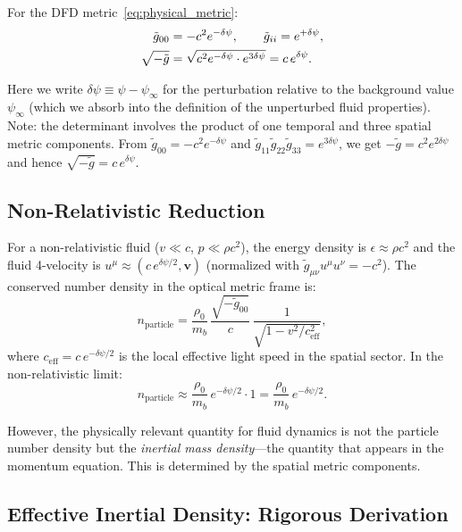 \documentclass[12pt,twocolumn]{article}
\newcommand{\Reff}{\mathrm{eff}}
\newcommand{\vvec}{\mathbf{v}}
\newcommand{\dpsi}{\delta\psi}
\begin{document}
For the DFD metric~\eqref{eq:physical_metric}:
\begin{align}
\tilde{g}_{00} &= -c^2 e^{-\dpsi}, \qquad
\tilde{g}_{ii} = e^{+\dpsi}, \notag\\
\sqrt{-\tilde{g}} &= \sqrt{c^2 e^{-\dpsi} \cdot e^{3\dpsi}}
= c\,e^{\dpsi}.
\label{eq:metric_det}
\end{align}

Here we write $\dpsi \equiv \psi - \psi_\infty$ for the perturbation relative
to the background value $\psi_\infty$ (which we absorb into the definition
of the unperturbed fluid properties). Note: the determinant involves the
product of one temporal and three spatial metric components. From
$\tilde{g}_{00} = -c^2 e^{-\dpsi}$ and $\tilde{g}_{11}\tilde{g}_{22}
\tilde{g}_{33} = e^{3\dpsi}$, we get $-\tilde{g} = c^2 e^{2\dpsi}$ and hence
$\sqrt{-\tilde{g}} = c\,e^{\dpsi}$.

\subsection{Non-Relativistic Reduction}
\label{sec:nr_reduction}

For a non-relativistic fluid ($v \ll c$, $p \ll \rho c^2$), the energy density
is $\epsilon \approx \rho c^2$ and the fluid 4-velocity is
$u^\mu \approx (c\,e^{\dpsi/2}, \vvec)$ (normalized with $\tilde{g}_{\mu\nu}
u^\mu u^\nu = -c^2$). The conserved number density in the optical metric frame
is:
\begin{equation}
n_\mathrm{particle} = \frac{\rho_0}{m_b}\,
\frac{\sqrt{-\tilde{g}_{00}}}{c}\,\frac{1}{\sqrt{1-v^2/c_\Reff^2}},
\end{equation}
where $c_\Reff = c\,e^{-\dpsi/2}$ is the local effective light speed in the
spatial sector. In the non-relativistic limit:
\begin{equation}
n_\mathrm{particle} \approx \frac{\rho_0}{m_b}\,e^{-\dpsi/2}\cdot 1
= \frac{\rho_0}{m_b}\,e^{-\dpsi/2}.
\end{equation}

However, the physically relevant quantity for fluid dynamics is not the
particle number density but the \emph{inertial mass density}---the quantity
that appears in the momentum equation. This is determined by the spatial
metric components.

\subsection{Effective Inertial Density: Rigorous Derivation}
\label{sec:rho_eff}
\end{document}
